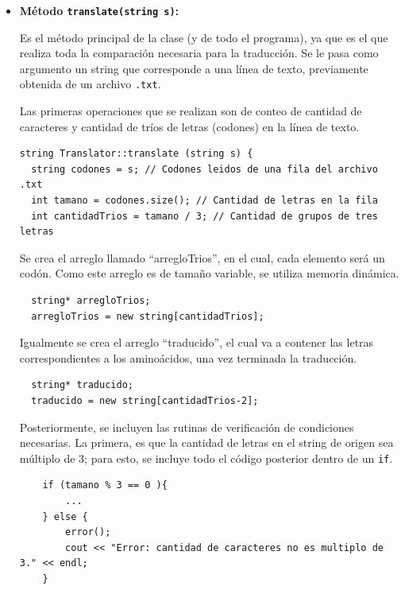 \begin{itemize}

\item \textbf{Método \texttt{translate(string s)}:}

Es el método principal de la clase (y de todo el programa), ya que es el que realiza toda la comparación necesaria para la traducción. Se le pasa como argumento un string que corresponde a una línea de texto, previamente obtenida de un archivo \texttt{.txt}.

Las primeras operaciones que se realizan son de conteo de cantidad de caracteres y cantidad de tríos de letras (codones) en la línea de texto.

\begin{verbatim}
string Translator::translate (string s) {
  string codones = s; // Codones leidos de una fila del archivo .txt
  int tamano = codones.size(); // Cantidad de letras en la fila  
  int cantidadTrios = tamano / 3; // Cantidad de grupos de tres letras
\end{verbatim}
Se crea el arreglo llamado ``arregloTrios'', en el cual, cada elemento será un codón. Como este arreglo es de tamaño variable, se utiliza memoria dinámica.

\begin{verbatim}
  string* arregloTrios;
  arregloTrios = new string[cantidadTrios];
\end{verbatim}

Igualmente se crea el arreglo ``traducido'', el cual va a contener las letras correspondientes a los aminoácidos, una vez terminada la traducción.

\begin{verbatim}
  string* traducido;
  traducido = new string[cantidadTrios-2];
\end{verbatim}

Posteriormente, se incluyen las rutinas de verificación de condiciones necesarias. La primera, es que la cantidad de letras en el string de origen sea múltiplo de 3; para esto, se incluye todo el código posterior dentro de un \texttt{if}. 

\begin{verbatim}
	if (tamano % 3 == 0 ){ 
		...
	} else {
		error();
		cout << "Error: cantidad de caracteres no es multiplo de 3." << endl;
  	}
\end{verbatim}


\end{itemize}
